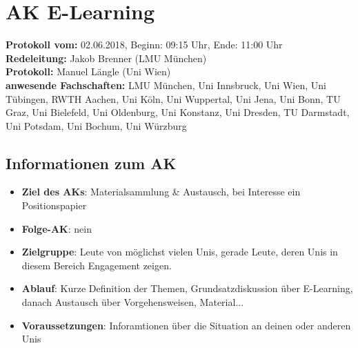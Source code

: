 
\section{AK E-Learning}

	\textbf{Protokoll vom:} 02.06.2018,
	Beginn: 09:15 Uhr,
	Ende: 11:00 Uhr \\
	\textbf{Redeleitung:} Jakob Brenner (LMU München) \\
	\textbf{Protokoll:} Manuel Längle (Uni Wien) \\
	\textbf{anwesende Fachschaften:} LMU München, Uni Innsbruck, Uni Wien, Uni Tübingen, RWTH Aachen, Uni Köln, Uni Wuppertal, Uni Jena, Uni Bonn, TU Graz, Uni Bielefeld, Uni Oldenburg, Uni Konstanz, Uni Dresden, TU Darmstadt, Uni Potsdam, Uni Bochum, Uni Würzburg

	\subsection*{Informationen zum AK}
		\begin{itemize}
			\item \textbf{Ziel des AKs}: Materialsammlung \& Austausch, bei Interesse ein Positionspapier
			\item \textbf{Folge-AK}: nein
			\item \textbf{Zielgruppe}: Leute von möglichst vielen Unis, gerade Leute, deren Unis in diesem Bereich Engagement zeigen.
			\item \textbf{Ablauf}: Kurze Definition der Themen, Grundsatzdiskussion über E-Learning, danach Austausch über Vorgehensweisen, Material...
			\item \textbf{Voraussetzungen}: Inforamtionen über die Situation an deinen oder anderen Unis
		\end{itemize}

